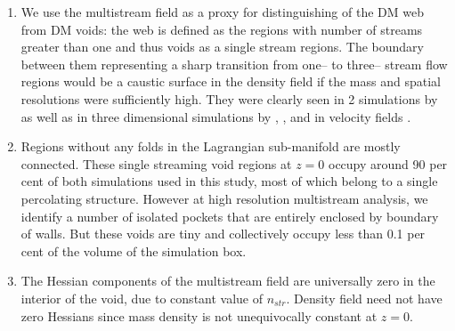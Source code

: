 \begin{enumerate}

\item We use the multistream field as a proxy for distinguishing of the DM web from DM voids: the web is defined as the regions
with number of streams greater than one and thus voids  as  a single stream regions. The boundary between them  
representing a sharp transition from one-- to three-- stream flow regions
would be a caustic surface in the density field if the mass and spatial resolutions were sufficiently high. They were clearly seen in 
2 simulations by \cite{Melott1989} as well as in three dimensional simulations by \cite{Angulo2016}, \cite{Hahn2016a}, \cite{Hahn2013} and in velocity fields \cite{Hahn2015a}.

\item Regions without any folds in the Lagrangian sub-manifold are mostly connected. These single streaming void regions at $z=0$ occupy around 90 per cent of both simulations used in this study, most of which belong to a single percolating structure. However at high resolution multistream analysis, we identify a number of isolated pockets that are entirely enclosed by boundary of walls. But these voids are tiny and collectively occupy less than 0.1 per cent of the volume of the simulation box.

\item The Hessian components of the multistream field are universally zero in the interior of the void, due to constant value of $n_{str}$. Density field need not have zero Hessians since mass density is not unequivocally constant at $z=0$. 

\end{enumerate}
